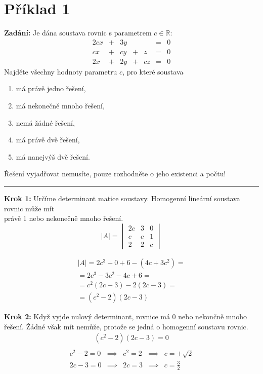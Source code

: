 \section{Příklad 1}
\textbf{Zadání:} Je dána soustava rovnic s parametrem $c \in \mathbb{R}$:\\
\begin{displaymath}
\begin{matrix}
&2cx&+&3y&&&=&0\\
&cx&+&cy&+&z&=&0&\\
&2x&+&2y&+&cz&=&0&
\end{matrix}
\end{displaymath}
Najděte všechny hodnoty parametru $c$, pro které soustava
\begin{enumerate}[label=\alph*)]
    \item má právě jedno řešení,
    \item má nekonečně mnoho řešení,
    \item nemá žádné řešení,
    \item má právě dvě řešení,
    \item má nanejvýš dvě řešení.
\end{enumerate}
Řešení vyjadřovat nemusíte, pouze rozhodněte o jeho existenci a počtu!
\par\noindent\rule{\textwidth}{0.4pt}

\textbf{Krok 1:} Určíme determinant matice soustavy. Homogenní lineární soustava rovnic může mít\\právě 1 nebo nekonečně mnoho řešení.
\begin{displaymath}
|A|=
\begin{vmatrix}
2c & 3 & 0 \\ 
c & c & 1 \\ 
2 & 2 & c
\end{vmatrix}
\end{displaymath}

\begin{displaymath}
\begin{matrix}
|A| = 2c^3 + 0 + 6 - (4c+3c^2)=\\
=2c^3-3c^2-4c+6=\\
=c^2(2c-3)-2(2c-3)=\\
=(c^2-2)(2c-3)
\end{matrix}
\end{displaymath}

\textbf{Krok 2:} Když vyjde nulový determinant, rovnice má 0 nebo nekončně mnoho řešení.
Žádné však mít nemůže, protože se jedná o homogenní soustavu rovnic.
\begin{displaymath}
\begin{matrix}
(c^2-2)(2c-3)=0\\
\end{matrix}
\end{displaymath}
\begin{displaymath}
\begin{matrix}
c^2-2=0 & \implies & c^2=2 & \implies & c=\pm\sqrt{2}\\
2c-3=0 & \implies & 2c=3 & \implies & c=\frac{3}{2}\\
\end{matrix}
\end{displaymath}

